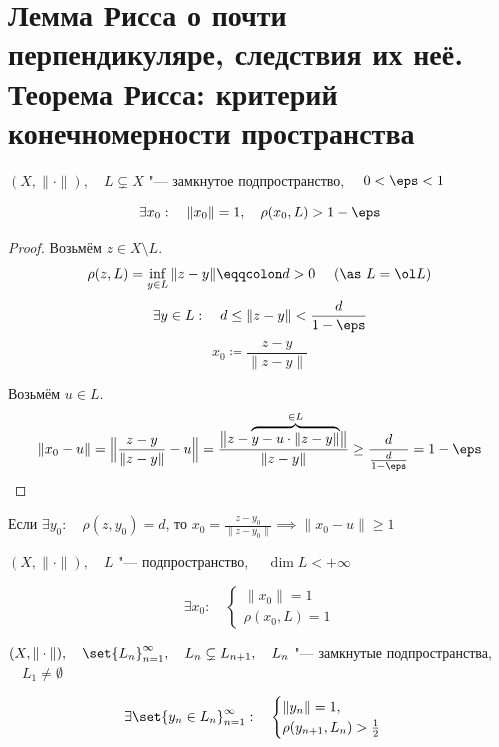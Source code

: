 \section{Лемма Рисса о почти перпендикуляре, следствия их неё.
Теорема Рисса: критерий конечномерности пространства}

\begin{lemma}
	$ (X, \|\cdot\|), \quad L \subsetneq X $ "--- замкнутое подпространство, $ \quad
	0 < \eps < 1 $

	$$ \exists x_0 : \quad \|x_0\| = 1, \quad \rho(x_0, L) > 1 - \eps $$
\end{lemma}

\begin{proof}
	Возьмём $ z \in X \setminus L $.
	$$ \rho(z, L) = \inf\limits_{y \in L} \|z - y\| \eqqcolon d > 0 \quad
	\text{ (\as $ L = \ol L $)} $$
	$$ \exists y \in L : \quad d \le \|z - y\| < \frac d{1 - \eps} $$
	$$ x_0 \coloneq \frac{z - y}{\|z - y\|} $$

	Возьмём $ u \in L $.
	$$ \|x_0 - u\| = \Bigl\| \frac{z - y}{\|z - y\|} - u \Bigr\| =
	\frac{\bigl\|z - \overbrace{y - u \cdot \|z - y\|}^{\in L} \bigr\|}{\|z - y\|} \ge
	\frac d {\frac d {1 - \eps}} = 1 - \eps $$
\end{proof}

\begin{remark}
	Если $ \exists y_0 : \quad \rho(z, y_0) = d $, то $ x_0 = \frac{z - y_0}{\|z - y_0\|} \implies
	\|x_0 - u\| \ge 1 $
\end{remark}

\begin{implication}
	$ (X, \|\cdot\|), \quad L $ "--- подпространство, $ \quad \dim L < +\infty $

	$$ \exists x_0 : \quad
	\begin{cases}
		\|x_0\| = 1 \\
		\rho(x_0, L) = 1
	\end{cases} $$
\end{implication}

\begin{implication}
	$ (X, \|\cdot\|), \quad \set{L_n}_{n = 1}^\infty, \quad L_n \subsetneq L_{n + 1}, \quad
	L_n $ "--- замкнутые подпространства, $ \quad L_1 \ne \emptyset $

	$$ \exists \set{y_n \in L_n}_{n = 1}^\infty : \quad
	\begin{cases}
		\|y_n\| = 1, \\
		\rho(y_{n + 1}, L_n) > \frac12
	\end{cases} $$
\end{implication}

